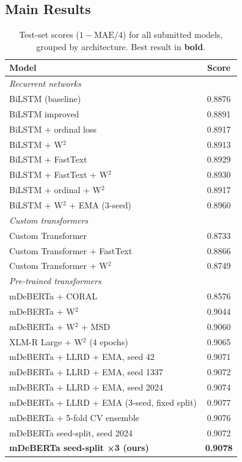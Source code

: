 \documentclass{article}
\begin{document}
\subsection{Main Results}

\begin{table}[h]
\centering
\caption{Test-set scores ($1 - \text{MAE}/4$) for all submitted models,
grouped by architecture. Best result in \textbf{bold}.}
\label{tab:main_results}
\vskip 0.1in
\begin{tabular}{lc}
\toprule
\textbf{Model} & \textbf{Score} \\
\midrule
\multicolumn{2}{l}{\textit{Recurrent networks}} \\
BiLSTM (baseline)                        & 0.8876 \\
BiLSTM improved                          & 0.8891 \\
BiLSTM + ordinal loss                    & 0.8917 \\
BiLSTM + W$^2$                           & 0.8913 \\
BiLSTM + FastText                        & 0.8929 \\
BiLSTM + FastText + W$^2$                & 0.8930 \\
BiLSTM + ordinal + W$^2$                 & 0.8917 \\
BiLSTM + W$^2$ + EMA (3-seed)            & 0.8960 \\
\midrule
\multicolumn{2}{l}{\textit{Custom transformers}} \\
Custom Transformer                       & 0.8733 \\
Custom Transformer + FastText            & 0.8866 \\
Custom Transformer + W$^2$               & 0.8749 \\
\midrule
\multicolumn{2}{l}{\textit{Pre-trained transformers}} \\
mDeBERTa + CORAL                         & 0.8576 \\
mDeBERTa + W$^2$                         & 0.9044 \\
mDeBERTa + W$^2$ + MSD                   & 0.9060 \\
XLM-R Large + W$^2$ (4 epochs)           & 0.9065 \\
mDeBERTa + LLRD + EMA, seed 42           & 0.9071 \\
mDeBERTa + LLRD + EMA, seed 1337         & 0.9072 \\
mDeBERTa + LLRD + EMA, seed 2024         & 0.9074 \\
mDeBERTa + LLRD + EMA (3-seed, fixed split) & 0.9077 \\
mDeBERTa + 5-fold CV ensemble            & 0.9076 \\
mDeBERTa seed-split, seed 2024           & 0.9072 \\
\textbf{mDeBERTa seed-split ×3 (ours)}   & \textbf{0.9078} \\
\bottomrule
\end{tabular}
\end{table}
\end{document}
